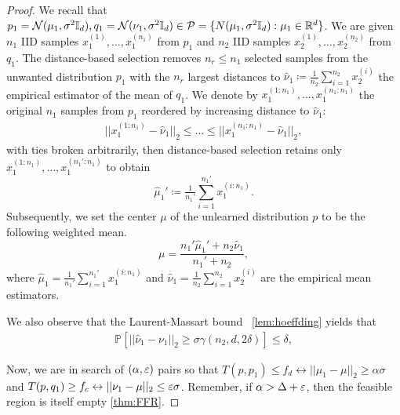\samplesselection*
\begin{proof}
    We recall that $p_1 = \mathcal{N}(\mu_1 , \sigma^2 \mathbb{I}_d), q_1 = \mathcal{N}(\nu_1 , \sigma^2\mathbb{I}_d) \in \mathcal{P} =\{N(\mu_1, \sigma^2\mathbb{I}_d): \mu_1\in \mathbb{R}^d\}$. We are given $n_1$ IID samples $x_1^{(1)}, \ldots, x_1^{(n_1)}$ from $p_1$ and $n_2$ IID samples $x_2^{(1)}, \ldots, x_2^{(n_2)}$  from $q_1$. The distance-based selection removes $n_r \leq n_1$ selected samples from the unwanted distribution $p_1$ with the $n_r$ largest distances to $\hat{\nu}_1 \coloneqq \tfrac{1}{n_2} \sum_{i=1}^{n_2} x_2^{(i)}$ the empirical estimator of the mean of $q_1$.
    We denote by $x_1^{(1:n_1)}, \ldots, x_1^{(n_1:n_1)}$ the original $n_1$ samples from $p_1$ reordered by increasing distance to $\hat{\nu}_1$:
    \begin{align}
        ||x_1^{(1:n_1)} - \hat{\nu}_1||_2
        \leq  \ldots \leq ||x_1^{(n_1:n_1)} - \hat{\nu}_1||_2,
    \end{align}
    with ties broken arbitrarily, then distance-based selection retains only $x_1^{(1:n_1)}, \ldots, x_1^{(n_1':n_1)}$ to obtain
    \begin{equation}
        \label{eq:selectionSRG}
        \hat{\mu}_1' \coloneqq \tfrac{1}{n_1'} \sum_{i=1}^{n_1'} x_1^{(i:n_1)}.
    \end{equation}
  Subsequently, we set the center $\mu$ of the unlearned distribution $p$ to be the following weighted mean.
    \begin{equation}
        \mu = \frac{n_1' \hat{\mu}_1' + n_2 \hat{\nu}_1}{n_1' + n_2},
    \end{equation}
    where $\hat{\mu}_1 = \tfrac{1}{n_1'} \sum_{i=1}^{n_1'} x_1^{(i:n_1)}$ and $\hat{\nu}_1 = \tfrac{1}{n_2} \sum_{i=1}^{n_2} x_2^{(i)}$ are the empirical mean estimators.
    
    We also observe that the Laurent-Massart bound ~\ref{lem:hoeffding} yields that
    \begin{align}
        \mathbb{P}\left[||\hat{\nu}_1 - \nu_1||_2 \geq \sigma \gamma(n_2,d,2\delta)\right]\leq \delta,
        \label{eq:hoeffding2}
    \end{align}


Now, we are in search of $(\alpha, \varepsilon)$ pairs so that $T(p,p_1) \leq f_d \leftrightarrow ||\mu_1-\mu||_2 \geq \alpha \sigma  $ and $T(p,q_1) \geq f_c \leftrightarrow ||\nu_1-\mu||_2 \leq \varepsilon \sigma $. Remember, if $\alpha >\Delta +\varepsilon$, then the feasible region is itself empty \ref{thm:FFR}.

\end{proof}
